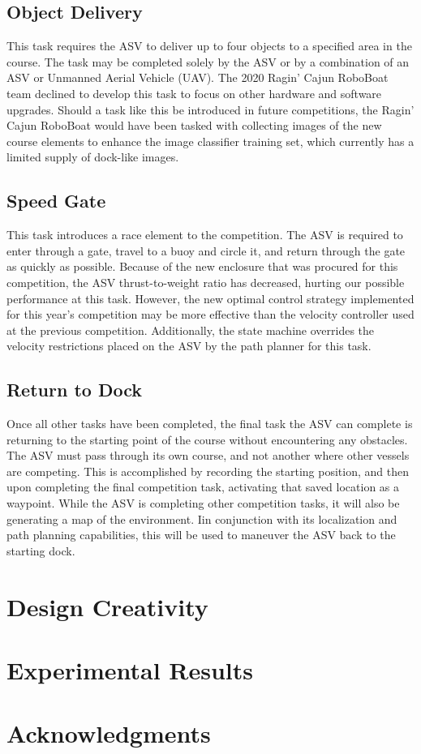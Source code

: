 \documentclass[letterpaper, 10 pt, conference]{ieeeconf}
\begin{document}
\subsection{Object Delivery}
\label{ObjectDelivery}
This task requires the ASV to deliver up to four objects to a specified area in the course. The task may be completed solely by the ASV or by a combination of an ASV or Unmanned Aerial Vehicle (UAV). The 2020 Ragin' Cajun RoboBoat team declined to develop this task to focus on other hardware and software upgrades. Should a task like this be introduced in future competitions, the Ragin' Cajun RoboBoat would have been tasked with collecting images of the new course elements to enhance the image classifier training set, which currently has a limited supply of dock-like images.

\subsection{Speed Gate}
\label{SpeedGate}
This task introduces a race element to the competition. The ASV is required to enter through a gate, travel to a buoy and circle it, and return through the gate as quickly as possible. Because of the new enclosure that was procured for this competition, the ASV thrust-to-weight ratio has decreased, hurting our possible performance at this task. However, the new optimal control strategy implemented for this year's competition may be more effective than the velocity controller used at the previous competition. Additionally, the state machine overrides the velocity restrictions placed on the ASV by the path planner for this task.

\subsection{Return to Dock}
\label{ReturnToDock}
Once all other tasks have been completed, the final task the ASV can complete is returning to the starting point of the course without encountering any obstacles. The ASV must pass through its own course, and not another where other vessels are competing. This is accomplished by recording the starting position, and then upon completing the final competition task, activating that saved location as a waypoint. While the ASV is completing other competition tasks, it will also be generating a map of the environment. Iin conjunction with its localization and path planning capabilities, this will be used to maneuver the ASV back to the starting dock.

\section{Design Creativity}
\section{Experimental Results}
\section{Acknowledgments}
\begin{appendix}
\end{appendix}
\end{document}
